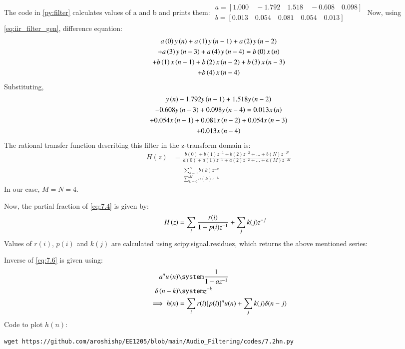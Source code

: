 \documentclass[journal,12pt,twocolumn]{IEEEtran}
\theoremstyle{remark}
\renewcommand\thesection{\arabic{section}}
\numberwithin{equation}{subsection}
\begin{document}
\begin{enumerate}[label=\thesection.\arabic*]
\solution The code in \ref{py:filter} calculates values of a and b and prints them:
$
\begin{array}{c}
  a = [ 1.000         \quad -1.792 \quad 1.518 \quad -0.608 \quad 0.098] \\
b = [0.013\quad 0.054 \quad 0.081\quad 0.054 \quad 0.013]
\end{array}
$
Now, using \eqref{eq:iir_filter_gen}, difference equation:
\begin{multline}
a\left(0\right)y\left(n\right) + a\left(1\right)y\left(n-1\right)+a\left(2\right)y\left(n-2\right)\\
+a\left(3\right)y\left(n-3\right)+a\left(4\right)y\left(n-4\right) =   b\left(0\right)x\left(n\right) \\
+ b\left(1\right)x\left(n-1\right)+b\left(2\right)x\left(n-2\right)+b\left(3\right)x\left(n-3\right)\\
+b\left(4\right)x\left(n-4\right) 
\end{multline}
Substituting,
\begin{multline}
    y\left(n\right) -1.792y\left(n-1\right)+1.518y\left(n-2\right)\\
-0.608y\left(n-3\right)+0.098y\left(n-4\right) = 0.013x\left(n\right) \\
+ 0.054x\left(n-1\right)+0.081x\left(n-2\right)+0.054x\left(n-3\right)\\
+0.013x\left(n-4\right) 
\end{multline}
The rational transfer function describing this filter in the z-transform domain is:
\begin{align}
     H(z) &= \frac{b(0) + b(1) z^{-1} + b(2) z^{-2} + \ldots + b(N) z^{-N}}{a(0) + a(1) z^{-1} + a(2) z^{-2} + \ldots + a(M) z^{-M}}\\ \label{eq:7.4}
    &= \frac{\sum_{k = 0}^{N}b(k)z^{-k}}{\sum_{k = 0}^{M}a(k)z^{-k}}
\end{align}
In our case, $M=N=4$.

Now, the partial fraction of \eqref{eq:7.4} is given by:
\begin{align}
   H\left(z\right)&= \sum_{i}\frac{r(i)}{1 - p(i)z^{-1}} + \sum_{j}k(j)z^{-j}\label{eq:7.6}
\end{align}
Values of $r(i)$, $p(i)$ and $k(j)$ are calculated using scipy.signal.residuez, which returns the above mentioned series:


Inverse of \eqref{eq:7.6} is given using:
\begin{align}
    a^{n}u\brak{n} &\system \frac{1}{1-az^{-1}}\\
    \delta\brak{n-k} &\system z^{-k}\\
    \implies h(n) &= \sum_{i}r(i)[p(i)]^nu(n) + \sum_{j}k(j)\delta(n - j)
\end{align}
Code to plot $h(n)$:
\begin{lstlisting}
wget https://github.com/aroshishp/EE1205/blob/main/Audio_Filtering/codes/7.2hn.py
\end{lstlisting}


\end{enumerate}
\end{document}
